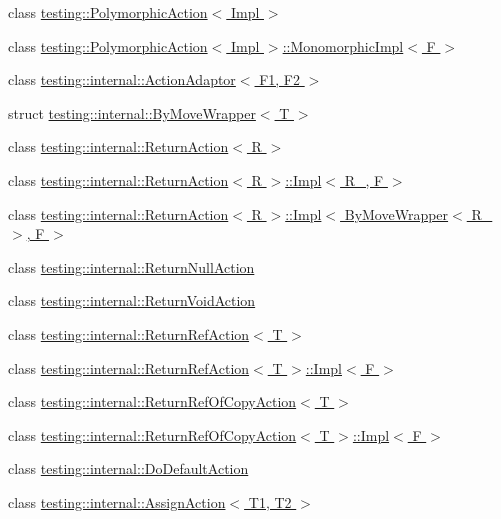 \begin{DoxyCompactItemize}
\item 
class \hyperlink{classtesting_1_1PolymorphicAction}{testing\+::\+Polymorphic\+Action$<$ Impl $>$}
\item 
class \hyperlink{classtesting_1_1PolymorphicAction_1_1MonomorphicImpl}{testing\+::\+Polymorphic\+Action$<$ Impl $>$\+::\+Monomorphic\+Impl$<$ F $>$}
\item 
class \hyperlink{classtesting_1_1internal_1_1ActionAdaptor}{testing\+::internal\+::\+Action\+Adaptor$<$ F1, F2 $>$}
\item 
struct \hyperlink{structtesting_1_1internal_1_1ByMoveWrapper}{testing\+::internal\+::\+By\+Move\+Wrapper$<$ T $>$}
\item 
class \hyperlink{classtesting_1_1internal_1_1ReturnAction}{testing\+::internal\+::\+Return\+Action$<$ R $>$}
\item 
class \hyperlink{classtesting_1_1internal_1_1ReturnAction_1_1Impl}{testing\+::internal\+::\+Return\+Action$<$ R $>$\+::\+Impl$<$ R\+\_\+, F $>$}
\item 
class \hyperlink{classtesting_1_1internal_1_1ReturnAction_1_1Impl_3_01ByMoveWrapper_3_01R___01_4_00_01F_01_4}{testing\+::internal\+::\+Return\+Action$<$ R $>$\+::\+Impl$<$ By\+Move\+Wrapper$<$ R\+\_\+ $>$, F $>$}
\item 
class \hyperlink{classtesting_1_1internal_1_1ReturnNullAction}{testing\+::internal\+::\+Return\+Null\+Action}
\item 
class \hyperlink{classtesting_1_1internal_1_1ReturnVoidAction}{testing\+::internal\+::\+Return\+Void\+Action}
\item 
class \hyperlink{classtesting_1_1internal_1_1ReturnRefAction}{testing\+::internal\+::\+Return\+Ref\+Action$<$ T $>$}
\item 
class \hyperlink{classtesting_1_1internal_1_1ReturnRefAction_1_1Impl}{testing\+::internal\+::\+Return\+Ref\+Action$<$ T $>$\+::\+Impl$<$ F $>$}
\item 
class \hyperlink{classtesting_1_1internal_1_1ReturnRefOfCopyAction}{testing\+::internal\+::\+Return\+Ref\+Of\+Copy\+Action$<$ T $>$}
\item 
class \hyperlink{classtesting_1_1internal_1_1ReturnRefOfCopyAction_1_1Impl}{testing\+::internal\+::\+Return\+Ref\+Of\+Copy\+Action$<$ T $>$\+::\+Impl$<$ F $>$}
\item 
class \hyperlink{classtesting_1_1internal_1_1DoDefaultAction}{testing\+::internal\+::\+Do\+Default\+Action}
\item 
class \hyperlink{classtesting_1_1internal_1_1AssignAction}{testing\+::internal\+::\+Assign\+Action$<$ T1, T2 $>$}

\end{DoxyCompactItemize}
